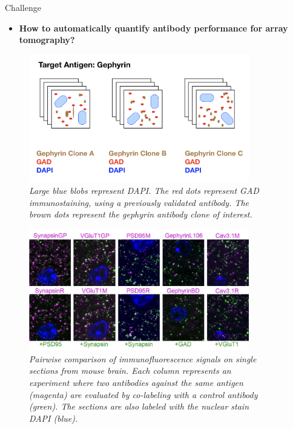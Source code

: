 \documentclass[final, table]{beamer}
\newlength{\sepwid}
\newlength{\onecolwid}
\begin{document}
\begin{frame}[t]  
\begin{columns}[t]  %

\begin{column}{\sepwid}\end{column}  %
\begin{column}{\onecolwid} 

\begin{block}{Challenge} 

\begin{itemize} 
\item \textbf{How to automatically quantify antibody performance for array tomography? }
\end{itemize} 


\begin{figure}
\centering
\includegraphics[width=0.9\textwidth]{figs/issuesWithAntibodies}
\caption{\textit{Large blue blobs represent DAPI.  The red dots represent GAD immunostaining, using a previously validated antibody. The brown dots represent the gephyrin antibody clone of interest. }}
\label{fig:issueswithantibodies}
\end{figure}


\begin{figure}
\centering
\includegraphics[width=0.9\textwidth]{figs/pairwise}
\caption{\textit{Pairwise comparison of immunofluorescence signals on single sections from mouse brain. Each column represents an experiment where two antibodies against the same antigen (magenta) are evaluated by co-labeling with a control antibody (green). The sections are also labeled with the nuclear stain DAPI (blue).}}
\label{fig:pairwise}
\end{figure}


\end{block}
\end{column}
\end{columns}
\end{frame}
\end{document}
